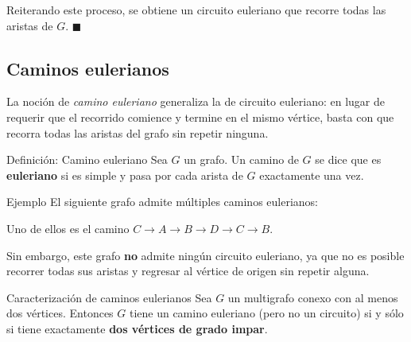 Reiterando este proceso, se obtiene un circuito euleriano que recorre todas las aristas de \( G \). \hfill $\blacksquare$


\subsection{Caminos eulerianos}

La noción de \emph{camino euleriano} generaliza la de circuito euleriano: en lugar de requerir que el recorrido comience y termine en el mismo vértice, basta con que recorra todas las aristas del grafo sin repetir ninguna.

\begin{definitionblock}{Definición: Camino euleriano}
Sea \( G \) un grafo. Un camino de \( G \) se dice que es \textbf{euleriano} si es simple y pasa por cada arista de \( G \) exactamente una vez.
\end{definitionblock}

\begin{exampleblock}{Ejemplo}
El siguiente grafo admite múltiples caminos eulerianos:

\begin{center}
\end{center}

Uno de ellos es el camino \( C \to A \to B \to D \to C \to B \).

\medskip

Sin embargo, este grafo \textbf{no} admite ningún circuito euleriano, ya que no es posible recorrer todas sus aristas y regresar al vértice de origen sin repetir alguna.
\end{exampleblock}

\begin{thmblock}{Caracterización de caminos eulerianos}
Sea \( G \) un multigrafo conexo con al menos dos vértices. Entonces \( G \) tiene un camino euleriano (pero no un circuito) si y sólo si tiene exactamente \textbf{dos vértices de grado impar}.
\end{thmblock}

